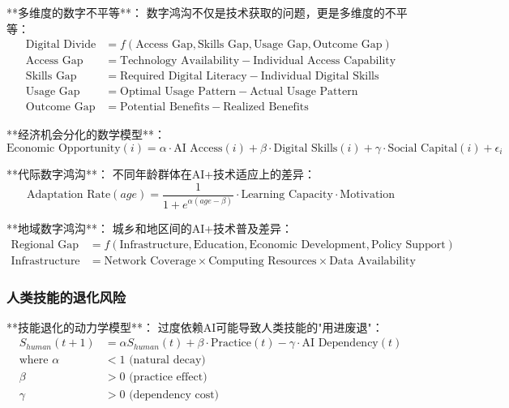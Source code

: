 **多维度的数字不平等**：
数字鸿沟不仅是技术获取的问题，更是多维度的不平等：
\begin{align}
\text{Digital Divide} &= f(\text{Access Gap}, \text{Skills Gap}, \text{Usage Gap}, \text{Outcome Gap}) \\
\text{Access Gap} &= \text{Technology Availability} - \text{Individual Access Capability} \\
\text{Skills Gap} &= \text{Required Digital Literacy} - \text{Individual Digital Skills} \\
\text{Usage Gap} &= \text{Optimal Usage Pattern} - \text{Actual Usage Pattern} \\
\text{Outcome Gap} &= \text{Potential Benefits} - \text{Realized Benefits}
\end{align}

**经济机会分化的数学模型**：
\begin{equation}
\text{Economic Opportunity}(i) = \alpha \cdot \text{AI Access}(i) + \beta \cdot \text{Digital Skills}(i) + \gamma \cdot \text{Social Capital}(i) + \epsilon_i
\end{equation}

**代际数字鸿沟**：
不同年龄群体在AI+技术适应上的差异：
\begin{equation}
\text{Adaptation Rate}(age) = \frac{1}{1 + e^{\alpha(age - \beta)}} \cdot \text{Learning Capacity} \cdot \text{Motivation}
\end{equation}

**地域数字鸿沟**：
城乡和地区间的AI+技术普及差异：
\begin{align}
\text{Regional Gap} &= f(\text{Infrastructure}, \text{Education}, \text{Economic Development}, \text{Policy Support}) \\
\text{Infrastructure} &= \text{Network Coverage} \times \text{Computing Resources} \times \text{Data Availability}
\end{align}

\subsubsection{人类技能的退化风险} %

**技能退化的动力学模型**：
过度依赖AI可能导致人类技能的"用进废退"：
\begin{align}
S_{human}(t+1) &= \alpha S_{human}(t) + \beta \cdot \text{Practice}(t) - \gamma \cdot \text{AI Dependency}(t) \\
\text{where } \alpha &< 1 \text{ (natural decay)} \\
\beta &> 0 \text{ (practice effect)} \\
\gamma &> 0 \text{ (dependency cost)}
\end{align}

